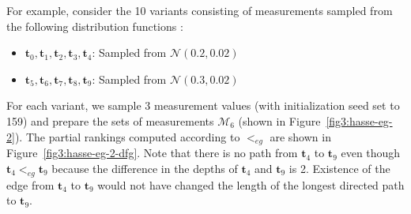 \documentclass[acmsmall,screen, review]{acmart}
\begin{document}
For example, consider the 10 variants consisting of measurements sampled from the following distribution functions :
\begin{itemize}
	\setlength{\itemsep}{0pt} 
	\item $\mathbf{t}_0, \mathbf{t}_1, \mathbf{t}_2, \mathbf{t}_3, \mathbf{t}_4 $: Sampled from $\mathcal{N}(0.2, 0.02)$
	\item $\mathbf{t}_5, \mathbf{t}_6, \mathbf{t}_7, \mathbf{t}_8, \mathbf{t}_9 $: Sampled from $\mathcal{N}(0.3, 0.02)$
\end{itemize}
For each variant, we sample 3 measurement values (with initialization seed set to 159) and prepare the sets of measurements $\mathcal{M}_6$ (shown in Figure~\ref{fig3:hasse-eg-2}). The partial rankings computed according to $<_{eg}$ are shown in Figure~\ref{fig3:hasse-eg-2-dfg}. Note that there is no path from $\mathbf{t}_4$ to $\mathbf{t}_9$ even though $\mathbf{t}_4 <_{eg} \mathbf{t}_9$ because the difference in the depths of $\mathbf{t}_4$ and $\mathbf{t}_9$ is 2.
Existence of the edge from $\mathbf{t}_4$ to $\mathbf{t}_9$ would not have changed the length of the longest directed path to $\mathbf{t}_9$.


\end{document}
